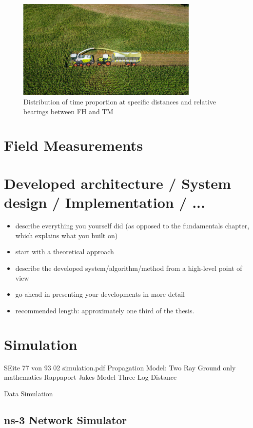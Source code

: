 \documentclass[]{nsm-thesis}
\begin{document}
\begin{figure}%
	\centering
	\includegraphics[width=0.8\textwidth]{figures/claas_harvest_behind.png}
	\caption{Distribution of time proportion at specific distances and relative bearings between \ac{FH} and \ac{TM}}%
	\label{fig:startpart}%
\end{figure}

\chapter{Field Measurements}


\chapter{Developed architecture / System design / Implementation / ...}


\begin{itemize}
\item describe everything you yourself did (as opposed to the fundamentals chapter, which explains what you built on)
\item start with a theoretical approach
\item describe the developed system/algorithm/method from a high-level point of view
\item go ahead in presenting your developments in more detail
\item recommended length: approximately one third of the thesis.
\end{itemize}

\chapter{Simulation}
SEite 77 von 93 02 simulation.pdf
Propagation Model:
 Two Ray Ground only mathematics Rappaport
 Jakes Model
 Three Log Distance
 
 
 Data Simulation
 
 
\section{ns-3 Network Simulator}
\end{document}
